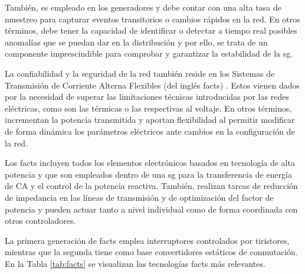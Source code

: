 \vspace{3mm}

También, es empleado en los generadores y debe contar con una alta tasa de muestreo para capturar eventos transitorios o cambios rápidos en la red. En otros términos, debe tener la capacidad de identificar o detectar a tiempo real posibles anomalías que se puedan dar en la distribución y por ello, se trata de un componente imprescindible para comprobar y garantizar la estabilidad de la \gls{sg}. %

\vspace{3mm}

La confiabilidad y la seguridad de la red también reside en los Sistemas de Transmisión de Corriente Alterna Flexibles (del inglés \gls{facts}) \cite{facts} \cite{facts3}. Estos vienen dados por la necesidad de superar las limitaciones técnicas introducidas por las redes eléctricas, como son las térmicas o las respectivas al voltaje. En otros términos, incrementan la potencia transmitida y aportan flexibilidad al permitir modificar de forma dinámica los parámetros eléctricos ante cambios en la configuración de la red. 

\vspace{3mm}

Los \gls{facts} incluyen todos los elementos electrónicos basados en tecnología de alta potencia y que son empleados dentro de una \gls{sg} para la transferencia de energía de CA y el control de la potencia reactiva. También, realizan tareas de reducción de impedancia en las líneas de transmisión y de optimización del factor de potencia y pueden actuar tanto a nivel individual como de forma coordinada con otros controladores.

\vspace{3mm}

La primera generación de \gls{facts} emplea interruptores controlados por tiristores, mientras que la segunda tiene como base convertidores estáticos de conmutación. En la Tabla \ref{tab:facts} se visualizan las tecnologías \gls{facts} más relevantes. \cite{facts2} \cite{facts3}

